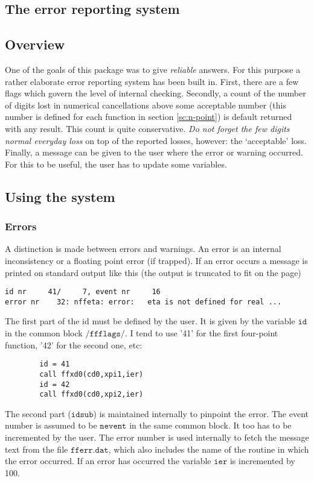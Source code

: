 \documentclass[twoside,12pt]{report}
\def\Code#1{\ensuremath{\texttt{#1}}}
\begin{document}
\begin{appendix}
\section{The error reporting system}

\subsection{Overview}

One of the goals of this package was to give {\em reliable} answers.  
For this purpose a rather elaborate error reporting system has been 
built in.  First, there are a few flags which govern the level of 
internal checking.  Secondly, a count of the number of digits lost in 
numerical cancellations above some acceptable number (this number is 
defined for each function in section \ref{sc:n-point}) is default 
returned with any result.  This count is quite conservative.  {\em Do 
not forget the few digits normal everyday loss} on top of the reported 
losses, however: the `acceptable' loss.  Finally, a message can be given 
to the user where the error or warning occurred. For this to be useful, 
the user has to update some variables.


\subsection{Using the system}

\subsubsection{Errors}

A distinction is made between errors and warnings.  An error is an 
internal inconsistency or a floating point error (if trapped).  If an 
error occurs a message is printed on standard output like this (the 
output is truncated to fit on the page)
\begin{verbatim}
id nr     41/     7, event nr     16
error nr    32: nffeta: error:   eta is not defined for real ...
\end{verbatim}
The first part of the id must be defined by the user.  It is given by 
the variable \Code{id} in the common block \Code{/ffflags/}.  I tend to 
use '41' for the first four-point function, '42' for the second one, 
etc:
\begin{verbatim}
        id = 41
        call ffxd0(cd0,xpi1,ier)
        id = 42
        call ffxd0(cd0,xpi2,ier)
\end{verbatim}
The second part (\Code{idsub}) is maintained internally to pinpoint the 
error.  The event number is assumed to be \Code{nevent} in the same 
common block.  It too has to be incremented by the user.  The error 
number is used internally to fetch the message text from the file 
\Code{fferr.dat}, which also includes the name of the routine in which 
the error occurred.  If an error has occurred the variable \Code{ier} is 
incremented by 100.


\end{appendix}
\end{document}
